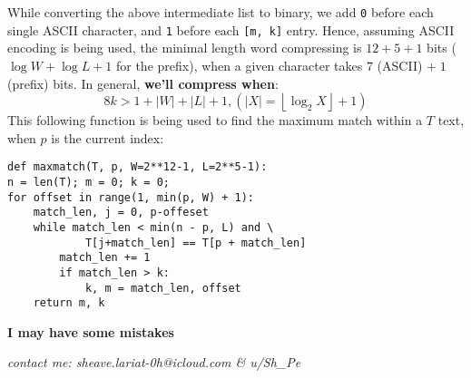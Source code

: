 \documentclass[]{article}
\newcommand\rf    {\right\rfloor}
\newcommand\lf    {\left\lfloor}
\begin{document}
\begin{multicols}{2}
		While converting the above intermediate list to binary, we add \texttt{0} before each single ASCII character, and \texttt{1} before each \texttt{[m, k]} entry. Hence, assuming ASCII encoding is being used, the minimal length word compressing is $12 + 5 + 1$ bits ($\log W + \log L + 1$ for the prefix), when a given character takes $7$ (ASCII) $+ \; 1$ (prefix) bits. In general, \textbf{we'll compress when}: 
		\[ 8k > 1 + |W| + |L| + 1, (|X| = \lf \log_2 X \rf + 1) \]
		This following function is being used to find the maximum match within a $T$ text, when $p$ is the current index: 
		\begin{lstlisting}
def maxmatch(T, p, W=2**12-1, L=2**5-1): 
n = len(T); m = 0; k = 0;
for offset in range(1, min(p, W) + 1):
	match_len, j = 0, p-offeset
	while match_len < min(n - p, L) and \
			T[j+match_len] == T[p + match_len]
		match_len += 1
		if match_len > k: 
			k, m = match_len, offset
	return m, k	\end{lstlisting}
		
		
		
	\end{multicols}
	
	\dotfill
	\begin{center}
		\Large \textbf{I may have some mistakes}
	\end{center}
	\dotfill
	
	{\let\newpage\relax\maketitle}
	\begin{center}
		
		\small\textit{contact me: sheave.lariat-0h@icloud.com \& u/Sh\_Pe}
		
	\end{center}
	\maketitle
	
	
\end{document}

